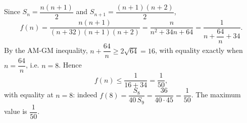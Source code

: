 Since $S_n=\dfrac{n(n+1)}{2}$ and $S_{n+1}=\dfrac{(n+1)(n+2)}{2}$,
\[f(n)=\dfrac{n(n+1)}{(n+32)(n+1)(n+2)}=\dfrac{n}{n^2+34n+64}=\dfrac{1}{n+\dfrac{64}{n}+34}.\]
By the AM-GM inequality, $n+\dfrac{64}{n}\ge2\sqrt{64}=16$, with equality exactly when $n=\dfrac{64}{n}$, i.e. $n=8$. Hence
\[f(n)\le\dfrac{1}{16+34}=\dfrac{1}{50},\]
with equality at $n=8$: indeed $f(8)=\dfrac{S_8}{40\,S_9}=\dfrac{36}{40\cdot45}=\dfrac{1}{50}$. The maximum value is $\boxed{\dfrac{1}{50}}$.
